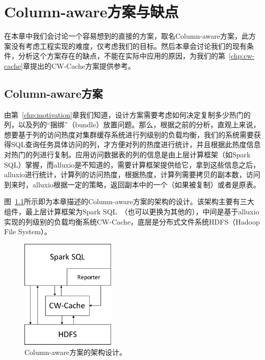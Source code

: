 \chapter{Column-aware方案与缺点}
\label{chp:column-aware}

\par 在本章中我们会讨论一个容易想到的直接的方案，取名Column-aware方案，此方案没有考虑工程实现的难度，仅考虑我们的目标。然后本章会讨论我们的现有条件，分析这个方案存在的缺点，不能在实际中应用的原因，为我们的第~\ref{chp:cw-cache}章提出的CW-Cache方案提供参考。

\section{Column-aware方案}

\par 由第~\ref{chp:motivation}章我们知道，设计方案需要考虑如何决定复制多少热门的列，以及列的“捆绑”（bundle）放置问题。那么，根据之前的分析，直观上来说，想要基于列的访问热度对集群缓存系统进行列级别的负载均衡，我们的系统需要获得SQL查询任务具体访问的列，才方便对列的热度进行统计，并且根据此热度信息对热门的列进行复制。应用访问数据表的列的信息是由上层计算框架（如Spark SQL）掌握，而alluxio是不知道的，需要计算框架提供给它，拿到这些信息之后，alluxio进行统计，计算列的访问热度，根据热度，计算列需要拷贝的副本数，访问到来时，alluxio根据一定的策略，返回副本中的一个（如果被复制）或者是原表。

\par 图~\ref{fig:sim-archi}所示即为本章描述的Column-aware方案的架构的设计。该架构主要有三大组件，最上层计算框架为Spark SQL~\cite{spark-sql}（也可以更换为其他的），中间是基于alluxio\cite{alluxio}实现的列级别的负载均衡系统CW-Cache，底层是分布式文件系统HDFS（Hadoop File System）\cite{hdfs}。

\begin{figure}[]
	\centering
	\includegraphics[width=0.4\textwidth]{img/column-aware/sim-archi}
	
	\caption{Column-aware方案的架构设计。}
	\label{fig:sim-archi}
\end{figure}

